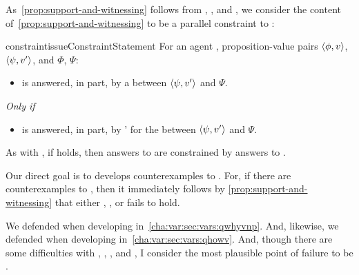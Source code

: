 \begin{note}
  As~\autoref{prop:support-and-witnessing} follows from \linkW{}, \linkH{}, and \issueInclusion{}, we consider the content of~\autoref{prop:support-and-witnessing} to be a parallel constraint to \issueInclusion{}:

  \begin{restatable}[\issueConstraint{}]{constraint}{issueConstraintStatement}
    \label{issue:has-witnessed}
    For an agent \vAgent{}, proposition-value pairs \(\langle \phi, v \rangle\), \(\langle \psi, v' \rangle\), and  \(\Phi\), \(\Psi\):

    \begin{itemize}
    \item
      \qWhyV{} is answered, in part, by a \ros{} between \(\langle \psi, v' \rangle\) and \(\Psi\).
    \end{itemize}

    \emph{Only if}

    \begin{itemize}
    \item
      \qHowV{} is answered, in part, by \vAgent{}'  for the \ros{} between \(\langle \psi, v' \rangle\) and \(\Psi\).
    \end{itemize}
    \vspace{-\baselineskip}
  \end{restatable}

  As with \issueInclusion{}, if \issueConstraint{} holds, then answers to \qWhyV{} are constrained by answers to \qHowV{}.

  Our direct goal is to develops counterexamples to \issueConstraint{}.
  For, if there are counterexamples to \issueConstraint{}, then it immediately follows by \autoref{prop:support-and-witnessing} that either \linkW{}, \linkH{}, or \issueInclusion{} fails to hold.

  We defended \linkW{} when developing \qWhyV{} in~\autoref{cha:var:sec:vars:qwhyvnp}.
  And, likewise, we defended \linkH{} when developing \qHowV{} in~\autoref{cha:var:sec:vars:qhowv}.
  And, though there are some difficulties with \qWhyV{}, \qHowV{}, \linkW{}, and \linkH{}, I consider the most plausible point of failure to be \issueInclusion{}.
\end{note}

